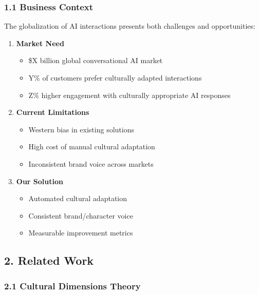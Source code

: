 \documentclass[
]{article}
\providecommand{\tightlist}{%
  \setlength{\itemsep}{0pt}\setlength{\parskip}{0pt}}
\begin{document}
\subsubsection{1.1 Business Context}\label{business-context}

The globalization of AI interactions presents both challenges and
opportunities:

\begin{enumerate}
\def\labelenumi{\arabic{enumi}.}
\tightlist
\item
  \textbf{Market Need}

  \begin{itemize}
  \tightlist
  \item
    \$X billion global conversational AI market
  \item
    Y\% of customers prefer culturally adapted interactions
  \item
    Z\% higher engagement with culturally appropriate AI responses
  \end{itemize}
\item
  \textbf{Current Limitations}

  \begin{itemize}
  \tightlist
  \item
    Western bias in existing solutions
  \item
    High cost of manual cultural adaptation
  \item
    Inconsistent brand voice across markets
  \end{itemize}
\item
  \textbf{Our Solution}

  \begin{itemize}
  \tightlist
  \item
    Automated cultural adaptation
  \item
    Consistent brand/character voice
  \item
    Measurable improvement metrics
  \end{itemize}
\end{enumerate}

\subsection{2. Related Work}\label{related-work}

\subsubsection{2.1 Cultural Dimensions
Theory}\label{cultural-dimensions-theory}
\end{document}
